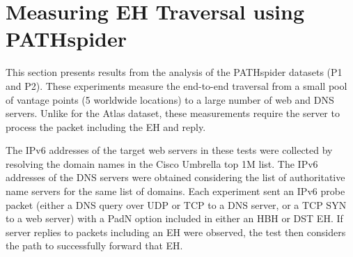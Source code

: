 \documentclass[conference]{IEEEtran}
\begin{document}

\section{Measuring EH Traversal using PATHspider} 
\label{sec:pathspider-results}

This section presents results from the analysis of the PATHspider datasets (P1 and P2).
These experiments measure the end-to-end traversal from a small
pool of vantage points (5 worldwide locations) to a large number of web and
DNS servers.  Unlike for the Atlas dataset, these
measurements require the server to process the packet including the EH and
reply.

The IPv6 addresses of the target web servers in these tests were collected by
resolving the domain names in the Cisco Umbrella top 1M list. The IPv6
addresses of the DNS servers were obtained considering the list of
authoritative name servers for the same list of domains.
Each experiment sent an IPv6 probe packet (either a DNS
query over UDP or TCP to a DNS server, or a TCP SYN to a web server) with a PadN option included in either an HBH or DST EH. If server replies to packets including an EH were observed, the test then considers the path to successfully forward that EH.

\end{document}

